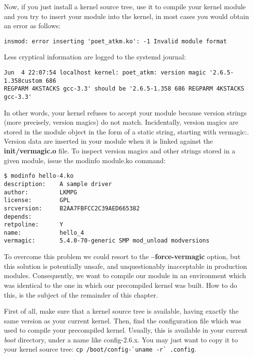 \documentclass[10pt, oneside]{book}
\begin{document}
Now, if you just install a kernel source tree, use it to compile your kernel module and you try to insert your module into the kernel, in most cases you would obtain an error as follows:

\begin{verbatim}
insmod: error inserting 'poet_atkm.ko': -1 Invalid module format
\end{verbatim}

Less cryptical information are logged to the systemd journal:

\begin{verbatim}
Jun  4 22:07:54 localhost kernel: poet_atkm: version magic '2.6.5-1.358custom 686
REGPARM 4KSTACKS gcc-3.3' should be '2.6.5-1.358 686 REGPARM 4KSTACKS gcc-3.3'
\end{verbatim}

In other words, your kernel refuses to accept your module because version strings (more precisely, version magics) do not match.
Incidentally, version magics are stored in the module object in the form of a static string, starting with vermagic:.
Version data are inserted in your module when it is linked against the \textbf{init/vermagic.o} file.
To inspect version magics and other strings stored in a given module, issue the modinfo module.ko command:

\begin{verbatim}
$ modinfo hello-4.ko
description:    A sample driver
author:         LKMPG
license:        GPL
srcversion:     B2AA7FBFCC2C39AED665382
depends:
retpoline:      Y
name:           hello_4
vermagic:       5.4.0-70-generic SMP mod_unload modversions
\end{verbatim}

To overcome this problem we could resort to the \textbf{--force-vermagic} option, but this solution is potentially unsafe, and unquestionably inacceptable in production modules.
Consequently, we want to compile our module in an environment which was identical to the one in which our precompiled kernel was built.
How to do this, is the subject of the remainder of this chapter.

First of all, make sure that a kernel source tree is available, having exactly the same version as your current kernel.
Then, find the configuration file which was used to compile your precompiled kernel.
Usually, this is available in your current \emph{boot} directory, under a name like config-2.6.x.
You may just want to copy it to your kernel source tree: \verb|cp /boot/config-`uname -r` .config|.
\end{document}

